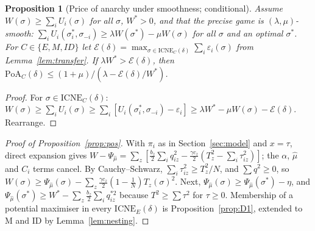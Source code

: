 \documentclass[preprint,12pt]{elsarticle}
\newtheorem{proposition}[theorem]{Proposition}
\theoremstyle{definition}
\theoremstyle{remark}
\newcommand{\ICNE}{\mathrm{ICNE}}
\begin{document}
\begin{proposition}[Price of anarchy under smoothness; conditional]\label{prop:smooth}
Assume $W(\sigma)\ge\sum_iU_i(\sigma)$ for all $\sigma$, $W^*>0$, and that the precise game is $(\lambda,\mu)$-smooth: $\sum_iU_i(\sigma^*_i,\sigma_{-i})\ge\lambda W(\sigma^*)-\mu W(\sigma)$ for all $\sigma$ and an optimal $\sigma^*$. For $C\in\{E,M,ID\}$ let $\mathcal E(\delta)=\max_{\sigma\in\ICNE_C(\delta)}\sum_i\varepsilon_i(\sigma)$ from Lemma~\ref{lem:transfer}. If $\lambda W^*>\mathcal E(\delta)$, then $\mathrm{PoA}_C(\delta)\le(1+\mu)/(\lambda-\mathcal E(\delta)/W^*)$.
\end{proposition}
\begin{proof}
For $\sigma\in\ICNE_C(\delta)$: $W(\sigma)\ge\sum_iU_i(\sigma)\ge\sum_i[U_i(\sigma^*_i,\sigma_{-i})-\varepsilon_i]\ge\lambda W^*-\mu W(\sigma)-\mathcal E(\delta)$. Rearrange.
\end{proof}

\begin{proof}[Proof of Proposition~\ref{prop:pos}]
With $\pi_i$ as in Section~\ref{sec:model} and $x=\tau$, direct expansion gives $W-\Psi_{\hat\mu}=\sum_z[\tfrac{b_z}{2}\sum_iq_{iz}^2-\tfrac{\gamma c_z}{2}(T_z^2-\sum_i\tau_{iz}^2)]$; the $\alpha$, $\hat\mu$ and $C_i$ terms cancel. By Cauchy--Schwarz, $\sum_i\tau_{iz}^2\ge T_z^2/N$, and $\sum q^2\ge0$, so $W(\sigma)\ge\Psi_{\hat\mu}(\sigma)-\sum_z\tfrac{\gamma c_z}{2}(1-\tfrac1N)T_z(\sigma)^2$. Next, $\Psi_{\hat\mu}(\sigma)\ge\Psi_{\hat\mu}(\sigma^*)-\eta$, and $\Psi_{\hat\mu}(\sigma^*)\ge W^*-\sum_z\tfrac{b_z}{2}\sum_iq_{iz}^{*2}$ because $T^2\ge\sum\tau^2$ for $\tau\ge0$. Membership of a potential maximiser in every $\ICNE_E(\delta)$ is Proposition~\ref{prop:D1}, extended to M and ID by Lemma~\ref{lem:nesting}.
\end{proof}
\end{document}
